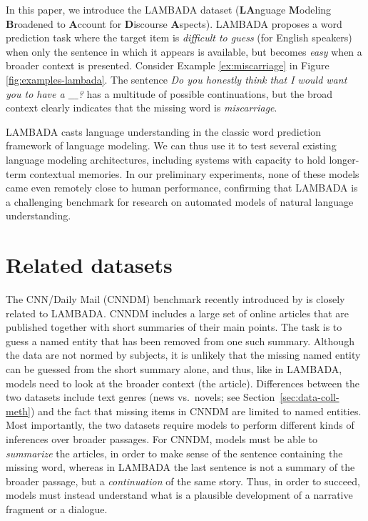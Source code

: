 In this paper, we introduce the LAMBADA dataset (\textbf{LA}nguage
\textbf{M}odeling \textbf{B}roadened to \textbf{A}ccount for
\textbf{D}iscourse \textbf{A}spects). LAMBADA proposes a word prediction task where the target item is \emph{difficult to guess} (for English speakers) when only the sentence in which it appears is available, but becomes \emph{easy} when a broader context is presented. Consider Example \ref{ex:miscarriage} in Figure
\ref{fig:examples-lambada}. The sentence \textit{Do you honestly think that I would want you to have a $\_\_\_$?} has a multitude of possible continuations, but the broad context clearly indicates that the missing word is \textit{miscarriage}.

LAMBADA casts language understanding in the classic word prediction framework of language modeling. We can thus use it to test several existing language modeling architectures, including systems with capacity to hold longer-term contextual memories. In our preliminary experiments, none of these models came even remotely close to human performance, confirming that LAMBADA is a challenging benchmark for research on automated models of natural language understanding.

\setcounter{ExNo}{0}

\setcounter{ExNo}{1}

\section{Related datasets}
\label{sec:related-work}

The CNN/Daily Mail (CNNDM) benchmark recently introduced by
 is closely related to LAMBADA.  CNNDM includes a large set of online articles that are published together with short summaries of their main points. The task is to guess a named entity that has been removed from one such summary. Although the data are not normed by subjects, it is unlikely that the missing named entity can be guessed from the short summary alone, and thus, like in LAMBADA, models need to look at the broader context (the article).  Differences between the two datasets include text genres (news vs.~novels; see Section~\ref{sec:data-coll-meth}) and the fact that missing items in CNNDM are limited to named entities. Most importantly, the two datasets require models to perform different kinds of inferences over broader passages. For CNNDM, models must be able to \emph{summarize} the articles, in order to make sense of the sentence containing the missing word, whereas in LAMBADA the last sentence is not a summary of the broader passage, but a
\emph{continuation} of the same story. Thus, in order to succeed, models must instead understand what is a plausible development of a narrative fragment or a dialogue.

